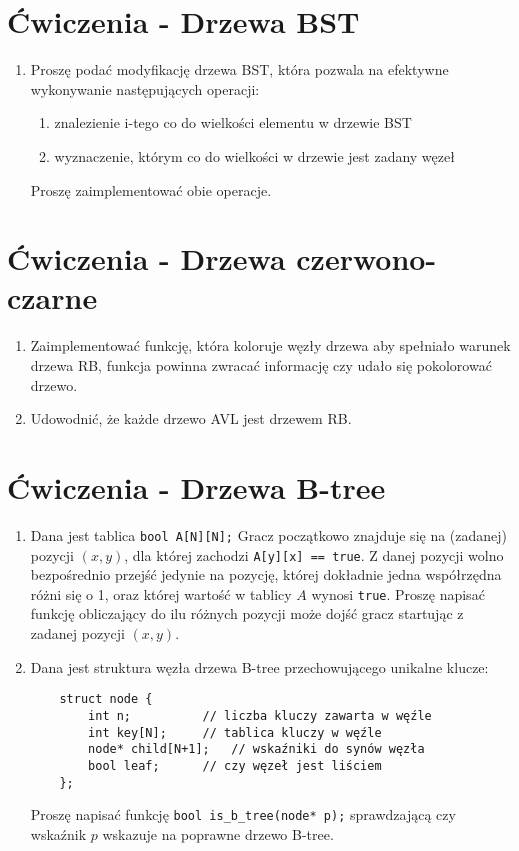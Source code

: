 \documentclass[11pt]{article}
\begin{document}
\section{Ćwiczenia - Drzewa BST}

\begin{enumerate}
	
	\item Proszę podać modyfikację drzewa BST, która pozwala na efektywne
	wykonywanie następujących operacji:
	\begin{enumerate}
		\item znalezienie i-tego co do wielkości elementu w drzewie BST
		\item wyznaczenie, którym co do wielkości w drzewie jest zadany węzeł
	\end{enumerate}
	Proszę zaimplementować obie operacje.
	
\end{enumerate}
\section{Ćwiczenia - Drzewa czerwono-czarne}

\begin{enumerate}
	
	\item Zaimplementować funkcję, która koloruje węzły drzewa aby spełniało warunek drzewa RB,
	funkcja powinna zwracać informację czy udało się pokolorować drzewo.
	\item Udowodnić, że każde drzewo AVL jest drzewem RB.
	
\end{enumerate}
\section{Ćwiczenia - Drzewa B-tree}

\begin{enumerate}
	
	\item Dana jest tablica \texttt{bool A[N][N];} Gracz początkowo znajduje się na (zadanej) pozycji $(x, y)$,
	dla której zachodzi \texttt{A[y][x] == true}. Z danej pozycji wolno bezpośrednio przejść jedynie na pozycję,
	której dokładnie jedna współrzędna różni się o 1, oraz której wartość w tablicy $A$ wynosi \texttt{true}.
	Proszę napisać funkcję obliczający do ilu różnych pozycji może dojść gracz startując z zadanej pozycji $(x,y)$.
	
	\item Dana jest struktura węzła drzewa B-tree przechowującego unikalne klucze: \newline
\begin{lstlisting}
	struct node {
		int n;			// liczba kluczy zawarta w węźle
		int key[N];		// tablica kluczy w węźle
		node* child[N+1];	// wskaźniki do synów węzła
		bool leaf;		// czy węzeł jest liściem
	};
\end{lstlisting}

	Proszę napisać funkcję \texttt{bool is\_b\_tree(node* p);} sprawdzającą czy
	wskaźnik $p$ wskazuje na poprawne drzewo B-tree.
	
	
\end{enumerate}
\end{document}
